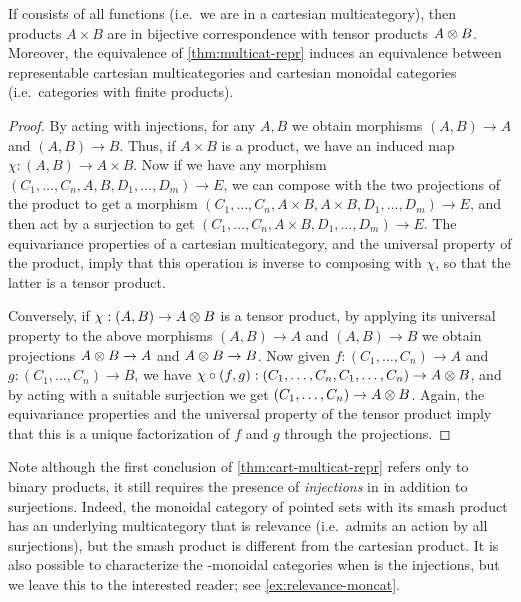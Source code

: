 \begin{thm}\label{thm:cart-multicat-repr}
  If \fS consists of all functions (i.e.\ we are in a cartesian multicategory), then products $A\times B$ are in bijective correspondence with tensor products $A\otimes B$.
  Moreover, the equivalence of \cref{thm:multicat-repr} induces an equivalence between representable cartesian multicategories and cartesian monoidal categories (i.e.\ categories with finite products).
\end{thm}
\begin{proof}
  By acting with injections, for any $A,B$ we obtain morphisms $(A,B)\to A$ and $(A,B)\to B$.
  Thus, if $A\times B$ is a product, we have an induced map $\chi:(A,B)\to A\times B$.
  Now if we have any morphism $(C_1,\dots,C_n,A,B,D_1,\dots,D_m)\to E$, we can compose with the two projections of the product to get a morphism $(C_1,\dots,C_n,A\times B,A\times B,D_1,\dots,D_m)\to E$, and then act by a surjection to get $(C_1,\dots,C_n,A\times B,D_1,\dots,D_m)\to E$.
  The equivariance properties of a cartesian multicategory, and the universal property of the product, imply that this operation is inverse to composing with $\chi$, so that the latter is a tensor product.

  Conversely, if $\chi:(A,B)\to A\otimes B$ is a tensor product, by applying its universal property to the above morphisms $(A,B)\to A$ and $(A,B)\to B$ we obtain projections $A\otimes B \to A$ and $A\otimes B\to B$.
  Now given $f:(C_1,\dots,C_n)\to A$ and $g:(C_1,\dots,C_n)\to B$, we have $\chi\circ (f,g) : (C_1,\dots,C_n,C_1,\dots,C_n) \to A\otimes B$, and by acting with a suitable surjection we get $(C_1,\dots,C_n)\to A\otimes B$.
  Again, the equivariance properties and the universal property of the tensor product imply that this is a unique factorization of $f$ and $g$ through the projections.
\end{proof}

Note although the first conclusion of \cref{thm:cart-multicat-repr} refers only to binary products, it still requires the presence of \emph{injections} in \fS in addition to surjections.
Indeed, the monoidal category of pointed sets with its smash product has an underlying multicategory that is relevance (i.e.\ admits an action by all surjections), but the smash product is different from the cartesian product.
It is also possible to characterize the \fS-monoidal categories when \fS is the injections, but we leave this to the interested reader; see \cref{ex:relevance-moncat}.

